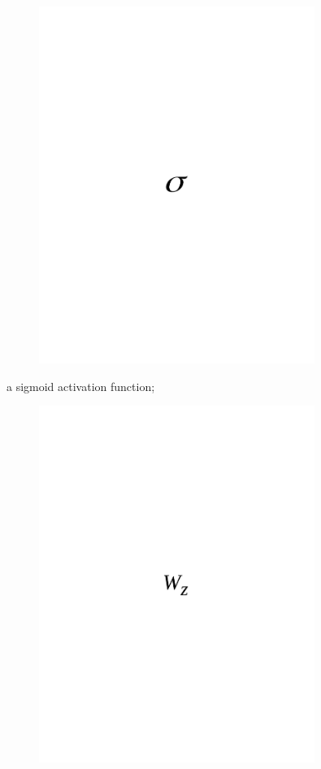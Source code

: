 \begin{figure}[H]
	\centering
	\includegraphics[width=0.8\textwidth]{media/ict/image47}
	\caption*{}
\end{figure}

a sigmoid activation function;
\begin{figure}[H]
	\centering
	\includegraphics[width=0.8\textwidth]{media/ict/image66}
	\caption*{}
\end{figure}

